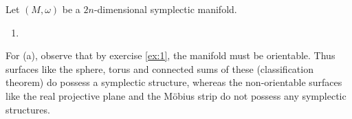 \begin{exercise}
Let $(M,\omega)$ be a $2n$-dimensional symplectic manifold. 
\begin{enumerate}[label = \textup{(}\alph*\textup{)}]
\item 
\end{enumerate}
\end{exercise}

\begin{solution}
	For (a), observe that by exercise \ref{ex:1}, the manifold must be orientable. Thus surfaces like the sphere, torus and connected sums of these (classification theorem) do possess a symplectic structure, whereas the non-orientable surfaces like the real projective plane and the M\"obius strip do not possess any symplectic structures.
\end{solution}


